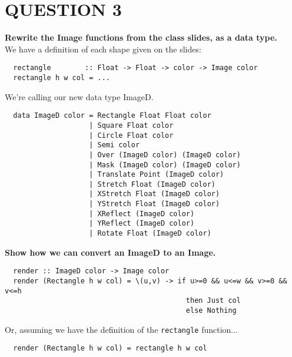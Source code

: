 \documentclass{article}
\begin{document}
\section*{QUESTION 3}
\textbf{Rewrite the Image functions from the class slides, as a data type.}\\
We have a definition of each shape given on the slides:
\begin{lstlisting}
  rectangle        :: Float -> Float -> color -> Image color
  rectangle h w col = ...
\end{lstlisting}
We're calling our new data type ImageD.
\begin{lstlisting}
  data ImageD color = Rectangle Float Float color
                    | Square Float color
                    | Circle Float color
                    | Semi color
                    | Over (ImageD color) (ImageD color)
                    | Mask (ImageD color) (ImageD color)
                    | Translate Point (ImageD color)
                    | Stretch Float (ImageD color)
                    | XStretch Float (ImageD color)
                    | YStretch Float (ImageD color)
                    | XReflect (ImageD color)
                    | YReflect (ImageD color)
                    | Rotate Float (ImageD color)
\end{lstlisting}

\noindent\textbf{Show how we can convert an ImageD to an Image.}

\begin{lstlisting}
  render :: ImageD color -> Image color
  render (Rectangle h w col) = \(u,v) -> if u>=0 && u<=w && v>=0 && v<=h 
                                           then Just col 
                                           else Nothing
\end{lstlisting}

\noindent Or, assuming we have the definition of the \lstinline{rectangle} function...
\begin{lstlisting}
  render (Rectangle h w col) = rectangle h w col
\end{lstlisting}
\end{document}
